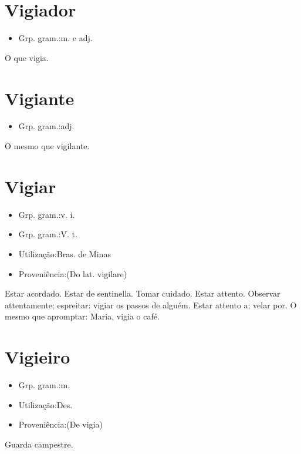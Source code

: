 \documentclass{article}
\begin{document}
\section{Vigiador}
\begin{itemize}
\item {Grp. gram.:m.  e  adj.}
\end{itemize}
O que vigia.
\section{Vigiante}
\begin{itemize}
\item {Grp. gram.:adj.}
\end{itemize}
O mesmo que \textunderscore vigilante\textunderscore .
\section{Vigiar}
\begin{itemize}
\item {Grp. gram.:v. i.}
\end{itemize}
\begin{itemize}
\item {Grp. gram.:V. t.}
\end{itemize}
\begin{itemize}
\item {Utilização:Bras. de Minas}
\end{itemize}
\begin{itemize}
\item {Proveniência:(Do lat. \textunderscore vigilare\textunderscore )}
\end{itemize}
Estar acordado.
Estar de sentinella.
Tomar cuidado.
Estar attento.
Observar attentamente; espreitar: \textunderscore vigiar os passos de alguém\textunderscore .
Estar attento a; velar por.
O mesmo que \textunderscore apromptar\textunderscore : \textunderscore Maria, vigia o café\textunderscore .
\section{Vigieiro}
\begin{itemize}
\item {Grp. gram.:m.}
\end{itemize}
\begin{itemize}
\item {Utilização:Des.}
\end{itemize}
\begin{itemize}
\item {Proveniência:(De \textunderscore vigia\textunderscore )}
\end{itemize}
Guarda campestre.
\end{document}
